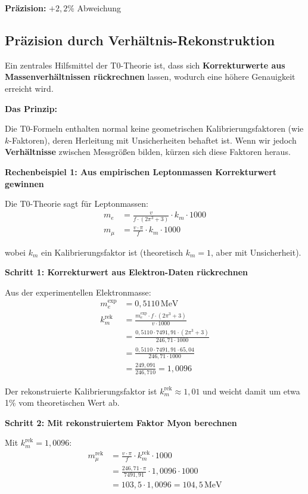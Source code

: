 	\textbf{Präzision:} \(+2{,}2\%\) Abweichung
	
	\subsection{Präzision durch Verhältnis-Rekonstruktion}
	
	Ein zentrales Hilfsmittel der T0-Theorie ist, dass sich \textbf{Korrekturwerte aus Massenverhältnissen rückrechnen} lassen, wodurch eine höhere Genauigkeit erreicht wird.
	
	\textbf{Das Prinzip:}
	
	Die T0-Formeln enthalten normal keine geometrischen Kalibrierungsfaktoren (wie \(k\)-Faktoren), deren Herleitung mit Unsicherheiten behaftet ist. Wenn wir jedoch \textbf{Verhältnisse} zwischen Messgrößen bilden, kürzen sich diese Faktoren heraus.
	
	\textbf{Rechenbeispiel 1: Aus empirischen Leptonmassen Korrekturwert gewinnen}
	
	Die T0-Theorie sagt für Leptonmassen:
	\begin{align}
		m_e &= \frac{v}{f \cdot (2\pi^3 + 3)} \cdot k_m \cdot 1000 \\
		m_\mu &= \frac{v \cdot \pi}{f} \cdot k_m \cdot 1000
	\end{align}
	
	wobei \(k_m\) ein Kalibrierungsfaktor ist (theoretisch \(k_m = 1\), aber mit Unsicherheit).
	
	\textbf{Schritt 1: Korrekturwert aus Elektron-Daten rückrechnen}
	
	Aus der experimentellen Elektronmasse:
	\begin{align}
		m_e^{\exp} &= 0{,}5110\,\text{MeV} \\
		k_m^{\text{rek}} &= \frac{m_e^{\exp} \cdot f \cdot (2\pi^3 + 3)}{v \cdot 1000} \\
		&= \frac{0{,}5110 \cdot 7491{,}91 \cdot (2\pi^3 + 3)}{246{,}71 \cdot 1000} \\
		&= \frac{0{,}5110 \cdot 7491{,}91 \cdot 65{,}04}{246{,}71 \cdot 1000} \\
		&= \frac{249{,}091}{246{,}710} = 1{,}0096
	\end{align}
	
	Der rekonstruierte Kalibrierungsfaktor ist \(k_m^{\text{rek}} \approx 1{,}01\) und weicht damit um etwa 1\% vom theoretischen Wert ab.
	
	\textbf{Schritt 2: Mit rekonstruiertem Faktor Myon berechnen}
	
	Mit \(k_m^{\text{rek}} = 1{,}0096\):
	\begin{align}
		m_\mu^{\text{rek}} &= \frac{v \cdot \pi}{f} \cdot k_m^{\text{rek}} \cdot 1000 \\
		&= \frac{246{,}71 \cdot \pi}{7491{,}91} \cdot 1{,}0096 \cdot 1000 \\
		&= 103{,}5 \cdot 1{,}0096 = 104{,}5\,\text{MeV}
	\end{align}
	
